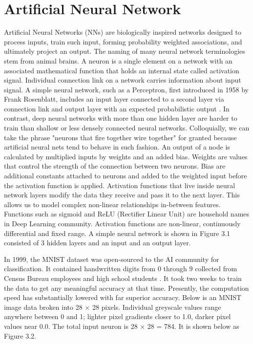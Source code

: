 \section{Artificial Neural Network}

\vspace{5mm}

Artificial Neural Networks (NNs) are biologically inspired networks designed to process inputs, train such input, forming probability weighted associations, and ultimately project an output. The naming of many neural network terminologies stem from animal brains.  A neuron is a single element on a network with an associated mathematical function that holds an internal state called activation signal. Individual connection link on a network carries information about input signal. A simple neural network, such as a Perceptron, first introduced in 1958 by Frank Rosenblatt, includes an input layer connected to a second layer via connection link and output layer with an expected probabilistic output \citep{Frank}. In contrast, deep neural networks with more than one hidden layer are harder to train than shallow or less densely connected neural networks. Colloquially, we can take the phrase "neurons that fire together wire together" for granted because artificial neural nets tend to behave in such fashion. An output of a node is calculated by multiplied inputs by weights and an added bias. Weights are values that control the strength of the connection between two neurons. Bias are additional constants attached to neurons and added to the weighted input before the activation function is applied. Activation functions that live inside neural network layers modify the data they receive and pass it to the next layer. This allows us to model complex non-linear relationships in-between features. Functions such as sigmoid and ReLU (Rectifier Linear Unit) are household names in Deep Learning community. Activation functions are non-linear, continuously differential and fixed range. A simple neural network is shown in Figure 3.1 consisted of 3 hidden layers and an input and an output layer.



In 1999, the MNIST dataset was open-sourced to the AI community for classification. It contained handwritten digits from 0 through 9 collected from Census Bureau employees and high school students \citep{MNIST}. It took two weeks to train the data to get any meaningful accuracy at that time. Presently, the computation speed has substantially lowered with far superior accuracy. Below is an MNIST image data broken into 28 $\times$ 28 pixels. Individual greyscale values range anywhere between 0 and 1; lighter pixel gradients closer to 1.0, darker pixel values near 0.0. The total input neuron is 28 $\times$ 28 = 784. It is shown below as Figure 3.2. 


